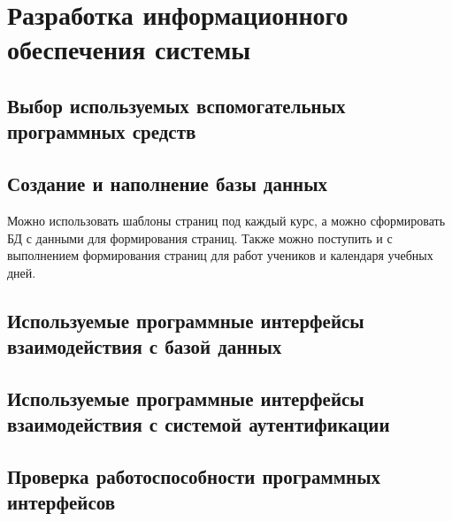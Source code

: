 \section{Разработка информационного обеспечения системы}

\subsection{Выбор используемых вспомогательных программных средств}


\subsection{Создание и наполнение базы данных}




Можно использовать шаблоны страниц под каждый курс, а можно сформировать БД с данными для формирования страниц.
Также можно поступить и с выполнением формирования страниц для работ учеников и календаря учебных дней.


\subsection{Используемые программные интерфейсы взаимодействия с базой данных}



\subsection{Используемые программные интерфейсы взаимодействия с системой аутентификации}

\subsection{Проверка работоспособности программных интерфейсов}


\clearpage
